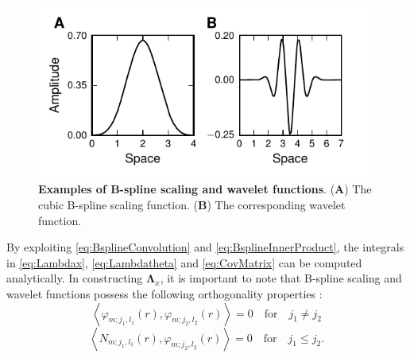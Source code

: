 \documentclass[11pt,draftcls,onecolumn,peerreview]{IEEEtran}
\begin{document}
\begin{figure}[!ht]
\centering
\includegraphics{./Graph/Figure1.pdf}
\caption{{\bf Examples of B-spline scaling and wavelet functions}. (\textbf{A}) The cubic B-spline scaling function. (\textbf{B}) The corresponding wavelet function.}
\label{fig:MRA-Figure1}
\end{figure}

By exploiting \eqref{eq:BsplineConvolution} and \eqref{eq:BsplineInnerProduct}, the integrals in \eqref{eq:Lambdax}, \eqref{eq:Lambdatheta} and \eqref{eq:CovMatrix} can be computed analytically. In constructing $\boldsymbol\Lambda_{x}$, it is important to note that B-spline scaling and wavelet functions possess the following orthogonality properties \cite{Unser1993}: 
\begin{equation}
  \left\langle \varphi_{m;j_1,l_1}(r),\varphi_{m;j_2,l_2}(r)\right\rangle =0  \quad \mathrm{for} \quad j_1\neq j_2
 \label{eq:MRA-PsiPsiOrthogonality} 
 \end{equation}
 \begin{equation}
  \left\langle N_{m;j_1,l_1}(r),\varphi_{m;j_2,l_2}(r)\right\rangle =0  \quad \mathrm{for} \quad j_1\leq j_2.
 \label{eq:MRA-PhiPsiOrthogonality}
 \end{equation}
\end{document}
